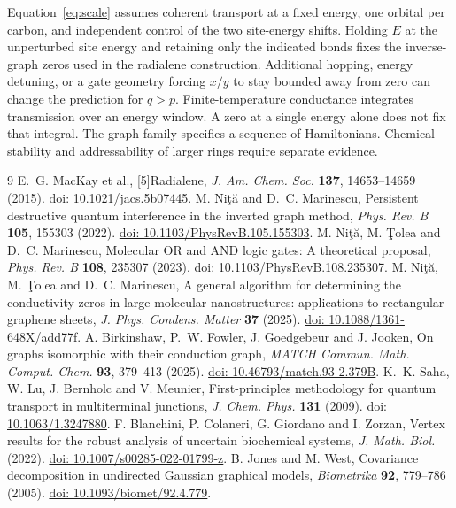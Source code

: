 \documentclass[11pt,a4paper]{article}
\newcommand{\doi}[1]{\href{https://doi.org/#1}{doi: #1}}
\begin{document}
Equation~\eqref{eq:scale} assumes coherent transport at a fixed energy, one orbital per carbon, and independent control of the two site-energy shifts. Holding $E$ at the unperturbed site energy and retaining only the indicated bonds fixes the inverse-graph zeros used in the radialene construction. Additional hopping, energy detuning, or a gate geometry forcing $x/y$ to stay bounded away from zero can change the prediction for $q>p$. Finite-temperature conductance integrates transmission over an energy window. A zero at a single energy alone does not fix that integral. The graph family specifies a sequence of Hamiltonians. Chemical stability and addressability of larger rings require separate evidence.

\begin{thebibliography}{9}\small
{} E.~G. MacKay et al., [5]Radialene, \emph{J. Am. Chem. Soc.} \textbf{137}, 14653--14659 (2015). \doi{10.1021/jacs.5b07445}.
 M. Ni\c{t}\u{a} and D.~C. Marinescu, Persistent destructive quantum interference in the inverted graph method, \emph{Phys. Rev. B} \textbf{105}, 155303 (2022). \doi{10.1103/PhysRevB.105.155303}.
 M. Ni\c{t}\u{a}, M. \c{T}olea and D.~C. Marinescu, Molecular OR and AND logic gates: A theoretical proposal, \emph{Phys. Rev. B} \textbf{108}, 235307 (2023). \doi{10.1103/PhysRevB.108.235307}.
 M. Ni\c{t}\u{a}, M. \c{T}olea and D.~C. Marinescu, A general algorithm for determining the conductivity zeros in large molecular nanostructures: applications to rectangular graphene sheets, \emph{J. Phys. Condens. Matter} \textbf{37} (2025). \doi{10.1088/1361-648X/add77f}.
 A. Birkinshaw, P.~W. Fowler, J. Goedgebeur and J. Jooken, On graphs isomorphic with their conduction graph, \emph{MATCH Commun. Math. Comput. Chem.} \textbf{93}, 379--413 (2025). \doi{10.46793/match.93-2.379B}.
 K.~K. Saha, W. Lu, J. Bernholc and V. Meunier, First-principles methodology for quantum transport in multiterminal junctions, \emph{J. Chem. Phys.} \textbf{131} (2009). \doi{10.1063/1.3247880}.
 F. Blanchini, P. Colaneri, G. Giordano and I. Zorzan, Vertex results for the robust analysis of uncertain biochemical systems, \emph{J. Math. Biol.} (2022). \doi{10.1007/s00285-022-01799-z}.
 B. Jones and M. West, Covariance decomposition in undirected Gaussian graphical models, \emph{Biometrika} \textbf{92}, 779--786 (2005). \doi{10.1093/biomet/92.4.779}.
\end{thebibliography}
\end{document}
